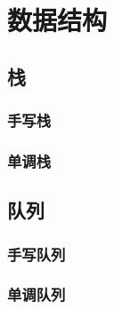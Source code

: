 \chapter{数据结构}\label{ch:data-structure}

\section{栈}\label{sec:stack}

\subsection{手写栈}\label{subsec:handwriting-stack}


\subsection{单调栈}\label{subsec:monotonic-stack}


\section{队列}\label{sec:queue}

\subsection{手写队列}\label{subsec:handwriting-queue}


\subsection{单调队列}\label{subsec:monotonic-queue}

